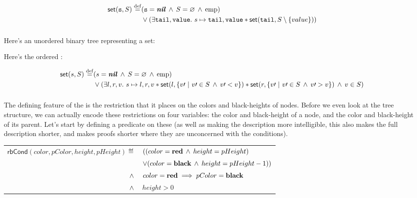 \begin{align*}
\mathsf{set}(\texttt{s}, S) \stackrel{\mathrm{def}}{=} & (\texttt{s} = \textbf{\textit{nil}} \hspace{0.2em}\land\hspace{0.2em} S = \varnothing \hspace{0.2em}\land\hspace{0.2em} \mathord\mathrm{emp}) \\
                             & \lor (\exists\texttt{tail}, \texttt{value}.\  s \mapsto \texttt{tail}, \texttt{value} \mathbin{\ast} \mathsf{set}(\texttt{tail}, S \setminus \left\{value\right\}) ) \\
\end{align*}



\subsubsection{\BST}

Here's an unordered binary tree representing a set:

Here's the ordered \BST:

\begin{align*}
\mathsf{set}(s, S) \stackrel{\mathrm{def}}{=} & (s = \textbf{\textit{nil}} \hspace{0.2em}\land\hspace{0.2em} S = \varnothing \hspace{0.2em}\land\hspace{0.2em} \mathord\mathrm{emp}) \\
                        & \lor (\exists l, r, v.\  s \mapsto l, r, v \mathbin{\ast} \mathsf{set}(l, \left\{v\prime \ \middle| \ v\prime \in S \hspace{0.2em}\land\hspace{0.2em} v\prime < v \right\}) \mathbin{\ast} \mathsf{set}(r, \left\{v\prime \ \middle| \ v\prime \in S \hspace{0.2em}\land\hspace{0.2em} v\prime > v \right\}) \hspace{0.2em}\land\hspace{0.2em} v \in S ) \\
\end{align*}


\subsubsection{\RBt}

The defining feature of the \RBt is
  the restriction that it places on the colors and black-heights of nodes.
Before we even look at the tree structure,
  we can actually encode these restrictions on four variables:
  the color and black-height of a node,
  and the color and black-height of its parent.
Let's start by defining a predicate on these
  (as well as making the description more intelligible,
  this also makes the full description shorter,
  and makes proofs shorter where they are unconcerned with the \RBt conditions).

\VEm
\begin{tabular}{ r l }
$\mathsf{rbCond} (color, pColor, height, pHeight) \eqdef$ & $((color = \mathbf{red} \hspace{0.2em}\land\hspace{0.2em} height = pHeight)$ \\
                                                          & $\lor (color = \mathbf{black} \hspace{0.2em}\land\hspace{0.2em} height = pHeight-1))$ \\
                                                  $\hspace{0.2em}\land\hspace{0.2em}$ & $color = \mathbf{red} \implies pColor = \mathbf{black}$ \\
                                                  $\hspace{0.2em}\land\hspace{0.2em}$ & $height > 0$ \\
\end{tabular}
\VEm

